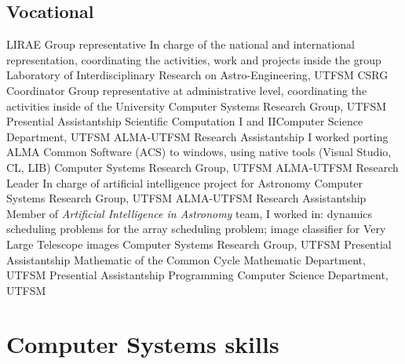 \documentclass[11pt,a4paper]{moderncv}
\begin{document}
\subsection{Vocational}
	{LIRAE Group representative}
	{In charge of the national and international representation, coordinating the activities, work and projects inside the group}
	{Laboratory of Interdisciplinary Research on Astro-Engineering, UTFSM}
	{}{}
	{CSRG Coordinator}
    {Group representative at administrative level, coordinating the activities
inside of the University}
	{Computer Systems Research Group, UTFSM}
	{}{}
	{Presential Assistantship}
	{Scientific Computation I and II}{Computer Science Department, UTFSM}
	{}{}
	{ALMA-UTFSM Research Assistantship}
    {I worked porting ALMA Common Software (ACS) to windows, using native tools (Visual Studio, CL, LIB)}
	{Computer Systems Research Group, UTFSM}
	{}{}
	{ALMA-UTFSM Research Leader}
	{In charge of artificial intelligence project for Astronomy}
	{Computer Systems Research Group, UTFSM}
	{}{}
	{ALMA-UTFSM Research Assistantship}
    {Member of \emph{Artificial Intelligence in Astronomy} team, I worked in:
dynamics scheduling problems for the array scheduling problem; image classifier
for Very Large Telescope images}
	{Computer Systems Research Group, UTFSM}
	{}{}
	{Presential Assistantship}
	{Mathematic of the Common Cycle}
	{Mathematic Department, UTFSM}
	{}{}
	{Presential Assistantship}
	{Programming}
	{Computer Science Department, UTFSM}
	{}{}

\section{Computer Systems skills}
\end{document}
